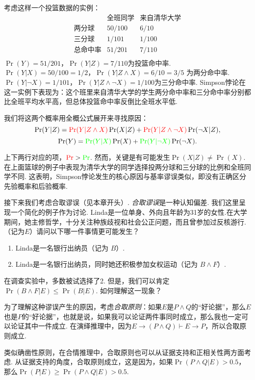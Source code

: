 考虑这样一个投篮数据的实例：
    \[
    \begin{array}{c|cc}
          & \text{全班同学} & \text{来自清华大学} \\ \hline
         \text{两分球} & 50/100 & 6/10 \\
         \text{三分球} & 1/101 & 1/100 \\
         \text{总命中率} & 51/201 & 7/110 \\
    \end{array}
    \]
$\Pr(Y) = 51/201$，$\Pr(Y|Z) = 7/110$为投篮命中率. $\Pr(Y|X) = 50/100 = 1/2$，$\Pr(Y|Z \wedge X) = 6/10 = 3/5$ 为两分命中率. $\Pr(Y|\neg X) = 1/101$，$\Pr(Y|Z \wedge \neg X) = 1/100$为三分命中率. Simpson悖论在这一实例下表现为：这个班里来自清华大学的学生两分命中率和三分命中率分别都比全班平均水平高，但总体投篮命中率反倒比全班水平低.

我们将这两个概率用全概公式展开来寻找原因：
$$\Pr(Y|Z) = \textcolor{red}{\Pr(Y|Z\land X)}\Pr(X|Z) + \textcolor{red}{\Pr(Y|Z\wedge\neg X)}\Pr(\neg X|Z),$$
$$\Pr(Y) = \textcolor{green}{\Pr(Y|X)}\Pr(X) +\textcolor{green}{ \Pr(Y|\neg X)}\Pr(\neg X).$$

上下两行对应的项，$\textcolor{red}{\Pr}>\textcolor{green}{\Pr}$. 然而，关键是有可能发生$\Pr(X|Z) \neq \Pr(X)$. 在上面篮球的例子中表现为清华大学的同学选择投两分球和三分球的比例和全班同学不同. 这表明，Simpson悖论发生的核心原因与基率谬误类似，即没有正确区分先验概率和后验概率.

接下来我们考虑合取谬误（见本章开头）. \emph{合取谬误}是一种认知偏差. 我们这里呈现一个简化的例子作为讨论. Linda是一位单身、外向且年龄为31岁的女性.在大学期间，她主修哲学，十分关注种族歧视和社会公正问题，而且曾参加过反核游行.（记为$E$）请问以下哪一件事情更可能发生？
    \begin{enumerate}
        \item Linda是一名银行出纳员（记为 $B$）.
        \item Linda是一名银行出纳员，同时她还积极参加女权运动（记为 $B\wedge F$）.
    \end{enumerate}
在调查实验中，多数被试选择了2. 但是，我们可以肯定 $\Pr(B \land F|E) \le \Pr(B|E)$. 如何理解这一现象？

为了理解这种谬误产生的原因，考虑\emph{合取原则}：如果$E$是$P\wedge Q$的“好论据”，那么$E$也是$P$的“好论据”，也就是说，如果我可以论证两件事同时成立，那么我也一定可以论证其中一件成立. 在演绎推理中，因为$E\to(P\wedge Q)\vdash E\to P$，所以合取原则成立. 

类似确凿性原则，在合情推理中，合取原则也可以从证据支持和正相关性两方面考虑. 从证据支持的角度，合取原则成立，这是因为，如果$\Pr(P\wedge Q|E)>0.5$，那么$\Pr(P|E)\geq \Pr(P\wedge Q|E)>0.5$.

